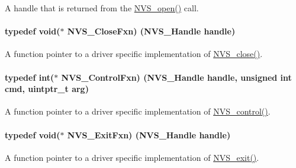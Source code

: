 A handle that is returned from the \hyperlink{_n_v_s_8h_ad3a3d1f1477312eeee6d2c907a25bd67}{N\+V\+S\+\_\+open()} call. 

\paragraph[{N\+V\+S\+\_\+\+Close\+Fxn}]{\setlength{\rightskip}{0pt plus 5cm}typedef void($\ast$ N\+V\+S\+\_\+\+Close\+Fxn) ({\bf N\+V\+S\+\_\+\+Handle} handle)}\label{_n_v_s_8h_a82f2a5311bf6dc69d62046fe20c3e108}


A function pointer to a driver specific implementation of \hyperlink{_n_v_s_8h_a12147fcc41f532802d97c0784c3e30c3}{N\+V\+S\+\_\+close()}. 

\paragraph[{N\+V\+S\+\_\+\+Control\+Fxn}]{\setlength{\rightskip}{0pt plus 5cm}typedef int($\ast$ N\+V\+S\+\_\+\+Control\+Fxn) ({\bf N\+V\+S\+\_\+\+Handle} handle, unsigned int cmd, uintptr\+\_\+t arg)}\label{_n_v_s_8h_a893a6b6ea0d408e348267109f3aa2736}


A function pointer to a driver specific implementation of \hyperlink{_n_v_s_8h_adb26bd05e4f063191411ac5ad968b1d9}{N\+V\+S\+\_\+control()}. 

\paragraph[{N\+V\+S\+\_\+\+Exit\+Fxn}]{\setlength{\rightskip}{0pt plus 5cm}typedef void($\ast$ N\+V\+S\+\_\+\+Exit\+Fxn) ({\bf N\+V\+S\+\_\+\+Handle} handle)}\label{_n_v_s_8h_ab15ab786e165ed50b8c2e7f6bf9e3173}


A function pointer to a driver specific implementation of \hyperlink{_n_v_s_8h_aa72b8cbb46bfc2a9e61102144a58b554}{N\+V\+S\+\_\+exit()}. 

